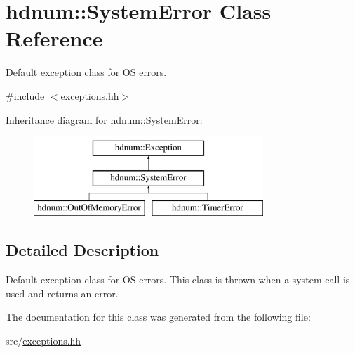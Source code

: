 \hypertarget{classhdnum_1_1SystemError}{
\section{hdnum::SystemError Class Reference}
\label{classhdnum_1_1SystemError}
}


Default exception class for OS errors.  




{\ttfamily \#include $<$exceptions.hh$>$}

Inheritance diagram for hdnum::SystemError:\begin{figure}[H]
\begin{center}
\leavevmode
\includegraphics[height=3cm]{classhdnum_1_1SystemError}
\end{center}
\end{figure}


\subsection{Detailed Description}
Default exception class for OS errors. This class is thrown when a system-\/call is used and returns an error. 

The documentation for this class was generated from the following file:\begin{DoxyCompactItemize}
\item 
src/\hyperlink{exceptions_8hh}{exceptions.hh}\end{DoxyCompactItemize}
